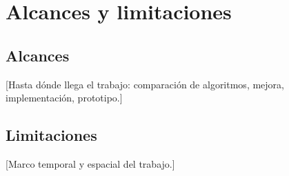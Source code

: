 \section{Alcances y limitaciones}
\label{sec:alcances}

\subsection{Alcances}
[Hasta dónde llega el trabajo: comparación de algoritmos, mejora, implementación, prototipo.]

\subsection{Limitaciones}
[Marco temporal y espacial del trabajo.]